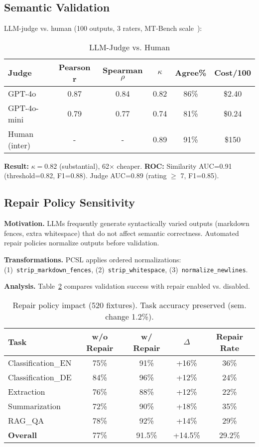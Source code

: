 \documentclass[sigconf]{acmart}
\begin{document}
\subsection{Semantic Validation}

LLM-judge vs. human (100 outputs, 3 raters, MT-Bench scale~\cite{zheng2023judging}):

\begin{table}[H]
\centering
\caption{LLM-Judge vs. Human}
\label{tab:judge}
\scriptsize
\begin{tabular}{@{}lccccc@{}}
\toprule
\textbf{Judge} & \textbf{Pearson r} & \textbf{Spearman \( \rho \)} & \textbf{\( \kappa \)} & \textbf{Agree\%} & \textbf{Cost/100} \\
\midrule
GPT-4o & 0.87 & 0.84 & 0.82 & 86\% & \$2.40 \\
GPT-4o-mini & 0.79 & 0.77 & 0.74 & 81\% & \$0.24 \\
Human (inter) & - & - & 0.89 & 91\% & \$150 \\
\bottomrule
\end{tabular}
\end{table}

\textbf{Result:} \( \kappa = 0.82 \) (substantial), 62\(\times\) cheaper. \textbf{ROC:} Similarity AUC=0.91 (threshold=0.82, F1=0.88). Judge AUC=0.89 (rating \( \geq \) 7, F1=0.85).

\subsection{Repair Policy Sensitivity}

\textbf{Motivation.} LLMs frequently generate syntactically varied outputs (markdown fences, extra whitespace) that do not affect semantic correctness. Automated repair policies normalize outputs before validation.

\textbf{Transformations.} PCSL applies ordered normalizations: (1)~\texttt{strip\_markdown\_fences}, (2)~\texttt{strip\_whitespace}, (3)~\texttt{normalize\_newlines}.

\textbf{Analysis.} Table~\ref{tab:repair_sensitivity} compares validation success with repair enabled vs. disabled.

\begin{table}[H]
\centering
\caption{Repair policy impact (520 fixtures). Task accuracy preserved (sem. change 1.2\%).}
\label{tab:repair_sensitivity}
\scriptsize
\begin{tabular}{@{}lcccc@{}}
\toprule
\textbf{Task} & \textbf{w/o Repair} & \textbf{w/ Repair} & \textbf{$\Delta$} & \textbf{Repair Rate} \\
\midrule
Classification\_EN & 75\% & 91\% & +16\% & 36\% \\
Classification\_DE & 84\% & 96\% & +12\% & 24\% \\
Extraction & 76\% & 88\% & +12\% & 22\% \\
Summarization & 72\% & 90\% & +18\% & 35\% \\
RAG\_QA & 78\% & 92\% & +14\% & 29\% \\
\midrule
\textbf{Overall} & 77\% & 91.5\% & +14.5\% & 29.2\% \\
\bottomrule
\end{tabular}
\end{table}
\end{document}

